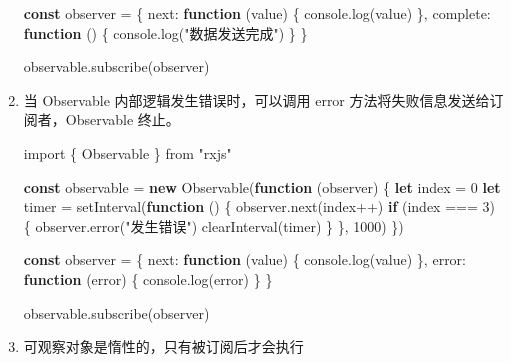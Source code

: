 \documentclass[
]{article}
\newenvironment{Shaded}{}{}
\newcommand{\BuiltInTok}[1]{#1}
\newcommand{\ControlFlowTok}[1]{\textcolor[rgb]{0.00,0.44,0.13}{\textbf{#1}}}
\newcommand{\DataTypeTok}[1]{\textcolor[rgb]{0.56,0.13,0.00}{#1}}
\newcommand{\DecValTok}[1]{\textcolor[rgb]{0.25,0.63,0.44}{#1}}
\newcommand{\FunctionTok}[1]{\textcolor[rgb]{0.02,0.16,0.49}{#1}}
\newcommand{\ImportTok}[1]{#1}
\newcommand{\KeywordTok}[1]{\textcolor[rgb]{0.00,0.44,0.13}{\textbf{#1}}}
\newcommand{\NormalTok}[1]{#1}
\newcommand{\OperatorTok}[1]{\textcolor[rgb]{0.40,0.40,0.40}{#1}}
\newcommand{\PreprocessorTok}[1]{\textcolor[rgb]{0.74,0.48,0.00}{#1}}
\newcommand{\StringTok}[1]{\textcolor[rgb]{0.25,0.44,0.63}{#1}}
\begin{document}
\begin{enumerate}
\begin{Shaded}
\begin{Highlighting}[]
\KeywordTok{const}\NormalTok{ observer }\OperatorTok{=}\NormalTok{ \{}
  \DataTypeTok{next}\OperatorTok{:} \KeywordTok{function}\NormalTok{ (value) \{}
    \BuiltInTok{console}\OperatorTok{.}\FunctionTok{log}\NormalTok{(value)}
\NormalTok{  \}}\OperatorTok{,}
  \DataTypeTok{complete}\OperatorTok{:} \KeywordTok{function}\NormalTok{ () \{}
    \BuiltInTok{console}\OperatorTok{.}\FunctionTok{log}\NormalTok{(}\StringTok{"数据发送完成"}\NormalTok{)}
\NormalTok{  \}}
\NormalTok{\}}

\NormalTok{observable}\OperatorTok{.}\FunctionTok{subscribe}\NormalTok{(observer)}
\end{Highlighting}
\end{Shaded}
\item
  当 Observable 内部逻辑发生错误时，可以调用 error
  方法将失败信息发送给订阅者，Observable 终止。

\begin{Shaded}
\begin{Highlighting}[]
\ImportTok{import}\NormalTok{ \{ Observable \} }\ImportTok{from} \StringTok{"rxjs"}

\KeywordTok{const}\NormalTok{ observable }\OperatorTok{=} \KeywordTok{new} \FunctionTok{Observable}\NormalTok{(}\KeywordTok{function}\NormalTok{ (observer) \{}
  \KeywordTok{let}\NormalTok{ index }\OperatorTok{=} \DecValTok{0}
  \KeywordTok{let}\NormalTok{ timer }\OperatorTok{=} \PreprocessorTok{setInterval}\NormalTok{(}\KeywordTok{function}\NormalTok{ () \{}
\NormalTok{    observer}\OperatorTok{.}\FunctionTok{next}\NormalTok{(index}\OperatorTok{++}\NormalTok{)}
    \ControlFlowTok{if}\NormalTok{ (index }\OperatorTok{===} \DecValTok{3}\NormalTok{) \{}
\NormalTok{      observer}\OperatorTok{.}\FunctionTok{error}\NormalTok{(}\StringTok{"发生错误"}\NormalTok{)}
      \PreprocessorTok{clearInterval}\NormalTok{(timer)}
\NormalTok{    \}}
\NormalTok{  \}}\OperatorTok{,} \DecValTok{1000}\NormalTok{)}
\NormalTok{\})}

\KeywordTok{const}\NormalTok{ observer }\OperatorTok{=}\NormalTok{ \{}
  \DataTypeTok{next}\OperatorTok{:} \KeywordTok{function}\NormalTok{ (value) \{}
    \BuiltInTok{console}\OperatorTok{.}\FunctionTok{log}\NormalTok{(value)}
\NormalTok{  \}}\OperatorTok{,}
  \DataTypeTok{error}\OperatorTok{:} \KeywordTok{function}\NormalTok{ (error) \{}
    \BuiltInTok{console}\OperatorTok{.}\FunctionTok{log}\NormalTok{(error)}
\NormalTok{  \}}
\NormalTok{\}}

\NormalTok{observable}\OperatorTok{.}\FunctionTok{subscribe}\NormalTok{(observer)}
\end{Highlighting}
\end{Shaded}
\item
  可观察对象是惰性的，只有被订阅后才会执行


\end{enumerate}
\end{document}
